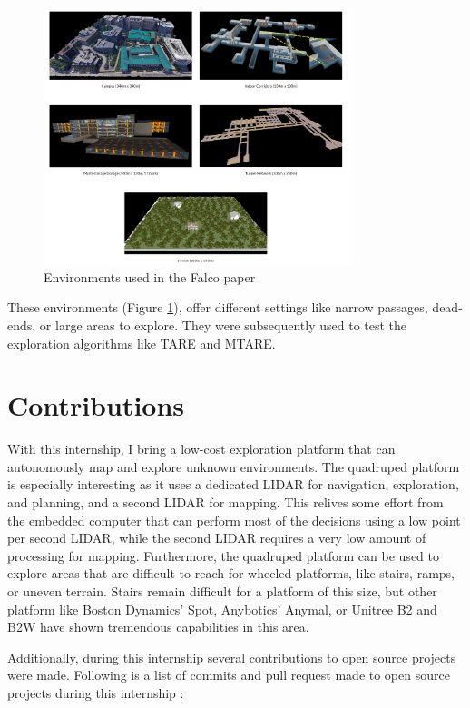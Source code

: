 \documentclass[11pt]{article}
\begin{document}
    \begin{figure}[H]
        \centering
        \includegraphics[width=0.8\textwidth]{Images/falco_environments.png}
        \caption{Environments used in the Falco paper}
        \label{fig:falco_environments}
    \end{figure}
    
    These environments (Figure \ref{fig:falco_environments}), offer different settings like narrow passages, dead-ends, or large areas to explore. They were subsequently used to test the exploration algorithms like TARE and MTARE.

\section{Contributions}

    With this internship, I bring a low-cost exploration platform that can autonomously map and explore unknown environments. The quadruped platform is especially interesting as it uses a dedicated LIDAR for navigation, exploration, and planning, and a second LIDAR for mapping. This relives some effort from the embedded computer that can perform most of the decisions using a low point per second LIDAR, while the second LIDAR requires a very low amount of processing for mapping. Furthermore, the quadruped platform can be used to explore areas that are difficult to reach for wheeled platforms, like stairs, ramps, or uneven terrain. Stairs remain difficult for a platform of this size, but other platform like Boston Dynamics' Spot, Anybotics' Anymal, or Unitree B2 and B2W have shown tremendous capabilities in this area.

    Additionally, during this internship several contributions to open source projects were made. Following is a list of commits and pull request made to open source projects during this internship :
\end{document}
